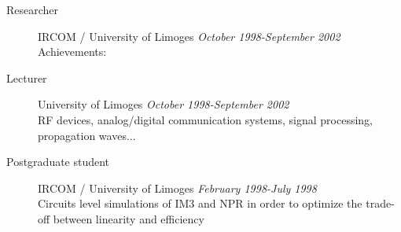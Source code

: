 \documentclass[margin,line]{resume}
\begin{document}
\begin{resume}
\begin{description}
      \item[Researcher]\small{IRCOM / University of Limoges \hfill
        \textsl{October 1998-September 2002}}\\
        Achievements:
        \vspace{2mm}

      \item[Lecturer]\small{University of Limoges \hfill
        \textsl{October 1998-September 2002}}\\
        RF devices, analog/digital communication systems, signal
        processing, propagation waves...
        \vspace{2mm}

      \item[Postgraduate student]\small{IRCOM / University of Limoges
        \hfill \textsl{February 1998-July 1998}}\\
        Circuits level simulations of IM3 and NPR in order to
        optimize the trade-off between linearity and efficiency

    \end{description}

  \end{resume}
  
\end{document}
